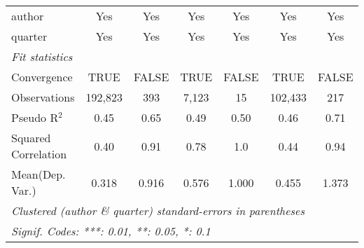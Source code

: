 \begin{tabular}{lcccccc}
   author                                                     & Yes           & Yes          & Yes           & Yes          & Yes            & Yes\\  
   quarter                                                    & Yes           & Yes          & Yes           & Yes          & Yes            & Yes\\  
   \midrule
   \emph{Fit statistics}\\
   Convergence                                                &TRUE           & FALSE        & TRUE          & FALSE        & TRUE           & FALSE\\  
   Observations                                               & 192,823       & 393          & 7,123         & 15           & 102,433        & 217\\  
   Pseudo R$^2$                                               & 0.45          & 0.65         & 0.49          & 0.50         & 0.46           & 0.71\\  
   Squared Correlation                                        & 0.40          & 0.91         & 0.78          & 1.0          & 0.44           & 0.94\\  
Mean(Dep. Var.) & 0.318 & 0.916 & 0.576 & 1.000 & 0.455 & 1.373 \\
   \midrule \midrule
   \multicolumn{7}{l}{\emph{Clustered (author \& quarter) standard-errors in parentheses}}\\
   \multicolumn{7}{l}{\emph{Signif. Codes: ***: 0.01, **: 0.05, *: 0.1}}\\
\end{tabular}
\par\endgroup
